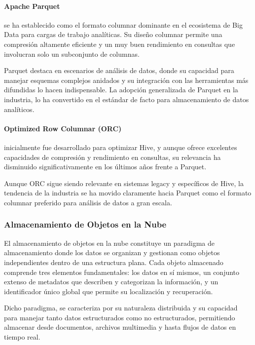 \newpage

\paragraph{Apache Parquet} 
se ha establecido como el formato columnar dominante en el ecosistema de 
Big Data para cargas de trabajo analíticas. Su diseño columnar permite una compresión 
altamente eficiente y un muy buen rendimiento en consultas que involucran solo un subconjunto de 
columnas. \newline

Parquet destaca en escenarios de análisis de datos, 
donde su capacidad para manejar esquemas complejos anidados y su integración con 
las herramientas más difundidas lo hacen indispensable. La adopción generalizada de Parquet en la 
industria, lo ha convertido en el estándar de facto para almacenamiento de datos analíticos.

\newpage
\paragraph{Optimized Row Columnar (ORC)} 
inicialmente fue desarrollado para optimizar Hive, 
y aunque ofrece excelentes capacidades de compresión y rendimiento en consultas, su relevancia 
ha disminuido significativamente en los últimos años frente a Parquet. \newline

Aunque ORC sigue siendo 
relevante en sistemas legacy y específicos de Hive, la tendencia de la industria se ha movido 
claramente hacia Parquet como el formato columnar preferido para análisis de datos a gran escala.

\subsubsection{Almacenamiento de Objetos en la Nube}

El almacenamiento de objetos en la nube constituye un paradigma de almacenamiento donde los datos se organizan y gestionan como objetos independientes dentro de una estructura plana.
Cada objeto almacenado comprende tres elementos fundamentales: los datos en sí mismos, un conjunto extenso de metadatos que describen y categorizan la información, 
y un identificador único global que permite su localización y recuperación. \newline

Dicho paradigma, se caracteriza por su naturaleza distribuida y su capacidad para manejar tanto datos estructurados como no estructurados, 
permitiendo almacenar desde documentos, archivos multimedia y hasta flujos de datos en tiempo real.\newline


